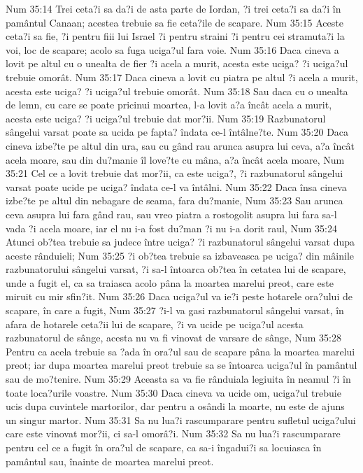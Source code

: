 Num 35:14  Trei ceta?i sa da?i de asta parte de Iordan, ?i trei ceta?i sa da?i în pamântul Canaan; acestea trebuie sa fie ceta?ile de scapare.
Num 35:15  Aceste ceta?i sa fie, ?i pentru fiii lui Israel ?i pentru straini ?i pentru cei stramuta?i la voi, loc de scapare; acolo sa fuga uciga?ul fara voie.
Num 35:16  Daca cineva a lovit pe altul cu o unealta de fier ?i acela a murit, acesta este uciga? ?i uciga?ul trebuie omorât.
Num 35:17  Daca cineva a lovit cu piatra pe altul ?i acela a murit, acesta este uciga? ?i uciga?ul trebuie omorât.
Num 35:18  Sau daca cu o unealta de lemn, cu care se poate pricinui moartea, l-a lovit a?a încât acela a murit, acesta este uciga? ?i uciga?ul trebuie dat mor?ii.
Num 35:19  Razbunatorul sângelui varsat poate sa ucida pe fapta? îndata ce-l întâlne?te.
Num 35:20  Daca cineva izbe?te pe altul din ura, sau cu gând rau arunca asupra lui ceva, a?a încât acela moare, sau din du?manie îl love?te cu mâna, a?a încât acela moare,
Num 35:21  Cel ce a lovit trebuie dat mor?ii, ca este uciga?, ?i razbunatorul sângelui varsat poate ucide pe uciga? îndata ce-l va întâlni.
Num 35:22  Daca însa cineva izbe?te pe altul din nebagare de seama, fara du?manie,
Num 35:23  Sau arunca ceva asupra lui fara gând rau, sau vreo piatra a rostogolit asupra lui fara sa-l vada ?i acela moare, iar el nu i-a fost du?man ?i nu i-a dorit raul,
Num 35:24  Atunci ob?tea trebuie sa judece între uciga? ?i razbunatorul sângelui varsat dupa aceste rânduieli;
Num 35:25  ?i ob?tea trebuie sa izbaveasca pe uciga? din mâinile razbunatorului sângelui varsat, ?i sa-l întoarca ob?tea în cetatea lui de scapare, unde a fugit el, ca sa traiasca acolo pâna la moartea marelui preot, care este miruit cu mir sfin?it.
Num 35:26  Daca uciga?ul va ie?i peste hotarele ora?ului de scapare, în care a fugit,
Num 35:27  ?i-l va gasi razbunatorul sângelui varsat, în afara de hotarele ceta?ii lui de scapare, ?i va ucide pe uciga?ul acesta razbunatorul de sânge, acesta nu va fi vinovat de varsare de sânge,
Num 35:28  Pentru ca acela trebuie sa ?ada în ora?ul sau de scapare pâna la moartea marelui preot; iar dupa moartea marelui preot trebuie sa se întoarca uciga?ul în pamântul sau de mo?tenire.
Num 35:29  Aceasta sa va fie rânduiala legiuita în neamul ?i în toate loca?urile voastre.
Num 35:30  Daca cineva va ucide om, uciga?ul trebuie ucis dupa cuvintele martorilor, dar pentru a osândi la moarte, nu este de ajuns un singur martor.
Num 35:31  Sa nu lua?i rascumparare pentru sufletul uciga?ului care este vinovat mor?ii, ci sa-l omorâ?i.
Num 35:32  Sa nu lua?i rascumparare pentru cel ce a fugit în ora?ul de scapare, ca sa-i îngadui?i sa locuiasca în pamântul sau, înainte de moartea marelui preot.
